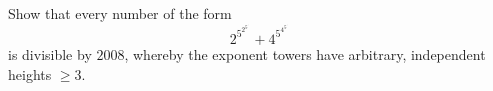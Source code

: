 Show that every number of the form 
$$2^{5^{2^{5^{\cdot^\cdot}}}} + 4^{5^{4^{5^{\cdot^\cdot}}}}$$
is divisible by $2008$, whereby the exponent towers have arbitrary, independent heights $\geq 3$.